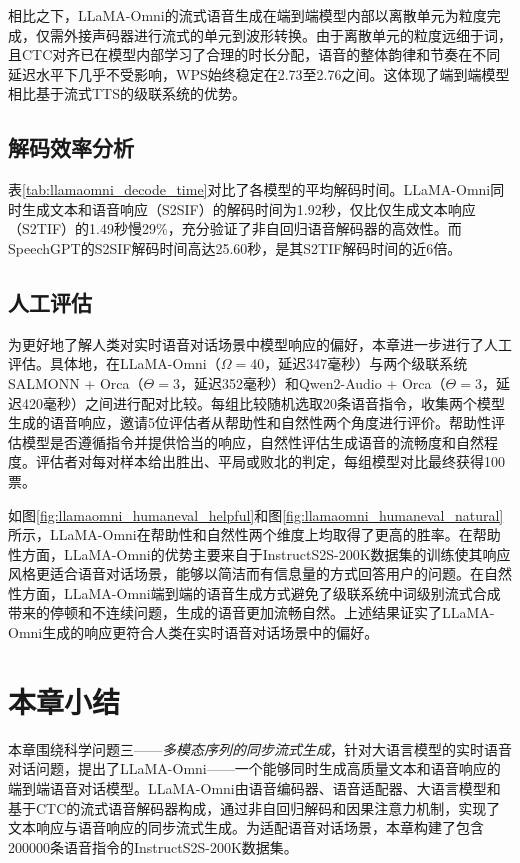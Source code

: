 相比之下，LLaMA-Omni的流式语音生成在端到端模型内部以离散单元为粒度完成，仅需外接声码器进行流式的单元到波形转换。由于离散单元的粒度远细于词，且CTC对齐已在模型内部学习了合理的时长分配，语音的整体韵律和节奏在不同延迟水平下几乎不受影响，WPS始终稳定在2.73至2.76之间。这体现了端到端模型相比基于流式TTS的级联系统的优势。

\subsection{解码效率分析}



表\ref{tab:llamaomni_decode_time}对比了各模型的平均解码时间。LLaMA-Omni同时生成文本和语音响应（S2SIF）的解码时间为1.92秒，仅比仅生成文本响应（S2TIF）的1.49秒慢29\%，充分验证了非自回归语音解码器的高效性。而SpeechGPT的S2SIF解码时间高达25.60秒，是其S2TIF解码时间的近6倍。

\subsection{人工评估}



为更好地了解人类对实时语音对话场景中模型响应的偏好，本章进一步进行了人工评估。具体地，在LLaMA-Omni（$\Omega = 40$，延迟347毫秒）与两个级联系统SALMONN + Orca（$\Theta = 3$，延迟352毫秒）和Qwen2-Audio + Orca（$\Theta = 3$，延迟420毫秒）之间进行配对比较。每组比较随机选取20条语音指令，收集两个模型生成的语音响应，邀请5位评估者从帮助性和自然性两个角度进行评价。帮助性评估模型是否遵循指令并提供恰当的响应，自然性评估生成语音的流畅度和自然程度。评估者对每对样本给出胜出、平局或败北的判定，每组模型对比最终获得100票。

如图\ref{fig:llamaomni_humaneval_helpful}和图\ref{fig:llamaomni_humaneval_natural}所示，LLaMA-Omni在帮助性和自然性两个维度上均取得了更高的胜率。在帮助性方面，LLaMA-Omni的优势主要来自于InstructS2S-200K数据集的训练使其响应风格更适合语音对话场景，能够以简洁而有信息量的方式回答用户的问题。在自然性方面，LLaMA-Omni端到端的语音生成方式避免了级联系统中词级别流式合成带来的停顿和不连续问题，生成的语音更加流畅自然。上述结果证实了LLaMA-Omni生成的响应更符合人类在实时语音对话场景中的偏好。


\section{本章小结}

本章围绕科学问题三——\textit{多模态序列的同步流式生成}，针对大语言模型的实时语音对话问题，提出了LLaMA-Omni——一个能够同时生成高质量文本和语音响应的端到端语音对话模型。LLaMA-Omni由语音编码器、语音适配器、大语言模型和基于CTC的流式语音解码器构成，通过非自回归解码和因果注意力机制，实现了文本响应与语音响应的同步流式生成。为适配语音对话场景，本章构建了包含200000条语音指令的InstructS2S-200K数据集。

